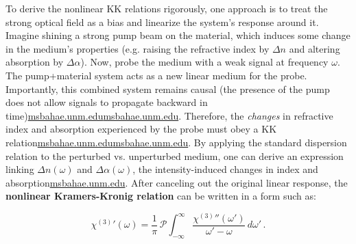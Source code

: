 \documentclass[11pt,a4paper]{article}
\begin{document}
To derive the nonlinear KK relations rigorously, one approach is to treat the strong optical field as a bias and linearize the system’s response around it. Imagine shining a strong pump beam on the material, which induces some change in the medium’s properties (e.g. raising the refractive index by $\Delta n$ and altering absorption by $\Delta \alpha$). Now, probe the medium with a weak signal at frequency $\omega$. The pump+material system acts as a new linear medium for the probe. Importantly, this combined system remains causal (the presence of the pump does not allow signals to propagate backward in time)\href{https://msbahae.unm.edu/Courses/568%20Nonlinear%20Optics/OSA-Handbook%20of%20Optics-IV-Ch17.pdf#:~:text=perturbation and we study the,31%2C 39]%3A ∫ ∞}{msbahae.unm.edu}\href{https://msbahae.unm.edu/Courses/568%20Nonlinear%20Optics/OSA-Handbook%20of%20Optics-IV-Ch17.pdf#:~:text=the fact that our new,∞ −∞ − %2B ∆}{msbahae.unm.edu}. Therefore, the \emph{changes} in refractive index and absorption experienced by the probe must obey a KK relation\href{https://msbahae.unm.edu/Courses/568%20Nonlinear%20Optics/OSA-Handbook%20of%20Optics-IV-Ch17.pdf#:~:text=us to write down a,1 2 2 ω}{msbahae.unm.edu}\href{https://msbahae.unm.edu/Courses/568%20Nonlinear%20Optics/OSA-Handbook%20of%20Optics-IV-Ch17.pdf#:~:text=ω ω ζ d cn,− ∆ ∆ %3D 0}{msbahae.unm.edu}. By applying the standard dispersion relation to the perturbed vs. unperturbed medium, one can derive an expression linking $\Delta n(\omega)$ and $\Delta \alpha(\omega)$, the intensity-induced changes in index and absorption\href{https://msbahae.unm.edu/Courses/568%20Nonlinear%20Optics/OSA-Handbook%20of%20Optics-IV-Ch17.pdf#:~:text=ω ω ζ d cn,− ∆ ∆ %3D 0}{msbahae.unm.edu}. After canceling out the original linear response, the \textbf{nonlinear Kramers-Kronig relation} can be written in a form such as:

$$
\chi^{(3)}{}'(\omega) = \frac{1}{\pi} \, \mathcal{P}\!\int_{-\infty}^{\infty} \frac{\chi^{(3)}{}''(\omega')}{\omega' - \omega}\, d\omega'\,.
$$
\end{document}
